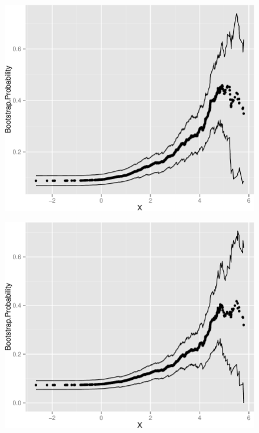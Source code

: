 \documentclass[11pt,]{article}
\begin{document}
\newpage

\begin{figure}[htbp]
\centering
\includegraphics{manuscript_files/figure-latex/epa_adult_cp -1.pdf}
\caption{}
\end{figure}

\newpage

\begin{figure}[htbp]
\centering
\includegraphics{manuscript_files/figure-latex/who_rec_low1_cp-1.pdf}
\caption{}
\end{figure}
\end{document}
